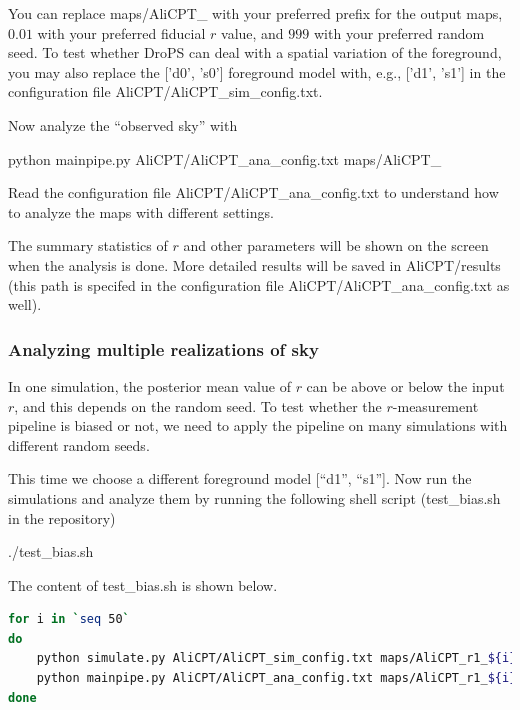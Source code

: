 \documentclass[12pt, a4paper]{ctexart} %
\def\tbox#1{\begin{tcolorbox}#1\end{tcolorbox}}
\begin{document}
You can replace maps/AliCPT\_ with your preferred prefix for the output maps, $0.01$ with your preferred fiducial $r$ value, and $999$ with your preferred random seed. To test whether DroPS can deal with a spatial variation of the foreground, you may also replace the ['d0', 's0'] foreground model with, e.g., ['d1', 's1'] in the configuration file AliCPT/AliCPT\_sim\_config.txt.

Now analyze the ``observed sky'' with
\tbox{python mainpipe.py AliCPT/AliCPT\_ana\_config.txt maps/AliCPT\_}
Read the configuration file AliCPT/AliCPT\_ana\_config.txt to understand how to analyze the maps with different settings.

The summary statistics of $r$ and other parameters will be shown on the screen when the analysis is done. More detailed results will be saved in AliCPT/results (this path is specifed in the configuration file AliCPT/AliCPT\_ana\_config.txt as well).

\subsubsection{Analyzing multiple realizations of sky}

In one simulation, the posterior mean value of $r$ can be above or below the input $r$, and this depends on the random seed. To test whether the $r$-measurement pipeline is biased or not, we need to apply the pipeline on many simulations with different random seeds.

This time we choose a different foreground model [``d1'', ``s1'']. Now run the simulations and analyze them by running the following shell script (test\_bias.sh in the repository)

\tbox{./test\_bias.sh}

The content of test\_bias.sh is shown below.

\begin{tcolorbox}
  \begin{minipage}{0.85\textwidth}
    \begin{scriptsize}
      \begin{lstlisting}[language=bash, caption={content of test\_bias.sh}]
for i in `seq 50` 
do 
    python simulate.py AliCPT/AliCPT_sim_config.txt maps/AliCPT_r1_${i}_  0.01 ${i}  d1s1  
    python mainpipe.py AliCPT/AliCPT_ana_config.txt maps/AliCPT_r1_${i}_ AliCPT/r1_logfile_d1s1.txt
done
      \end{lstlisting}
    \end{scriptsize}
\end{minipage}
\end{tcolorbox}
\end{document}
